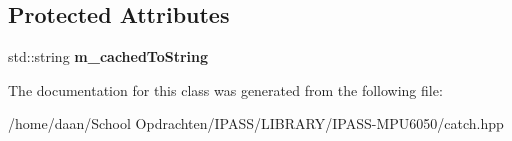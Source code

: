 \subsection*{Protected Attributes}
\begin{DoxyCompactItemize}
\item 
\mbox{\label{classCatch_1_1Matchers_1_1Impl_1_1MatcherUntypedBase_a951095c462657e7097a9a6dc4dde813f}} 
std\+::string {\bfseries m\+\_\+cached\+To\+String}
\end{DoxyCompactItemize}


The documentation for this class was generated from the following file\+:\begin{DoxyCompactItemize}
\item 
/home/daan/\+School Opdrachten/\+I\+P\+A\+S\+S/\+L\+I\+B\+R\+A\+R\+Y/\+I\+P\+A\+S\+S-\/\+M\+P\+U6050/catch.\+hpp\end{DoxyCompactItemize}
